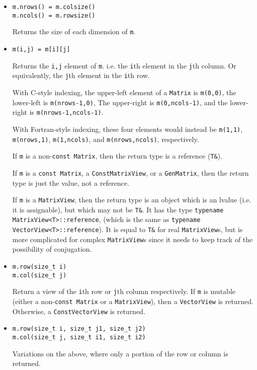 \documentclass[twoside,letterpaper,11pt]{article}
\renewcommand{\tt}[1]{{\texttt {#1}}}
\begin{document}
\begin{itemize}
\item
\begin{verbatim}
m.nrows() = m.colsize()
m.ncols() = m.rowsize()
\end{verbatim}
Returns the size of each dimension of \tt{m}. 

\item
\begin{verbatim}
m(i,j) = m[i][j]
\end{verbatim}
Returns the \tt{i,j} element of \tt{m}. i.e. the \tt{i}th element in the 
\tt{j}th column.  Or
equivalently, the \tt{j}th element in the \tt{i}th row. 

With C-style indexing, the upper-left element
of a \tt{Matrix} is \tt{m(0,0)}, the lower-left is \tt{m(nrows-1,0)},
The upper-right is \tt{m(0,ncols-1)}, and the lower-right is
\tt{m(nrows-1,ncols-1)}.

With Fortran-style indexing, these four elements would instead be
\tt{m(1,1)}, \tt{m(nrows,1)}, \tt{m(1,ncols)}, and \tt{m(nrows,ncols)},
respectively.

If \tt{m} is a 
non-\tt{const Matrix}, then the return type is a reference (\tt{T\&}).

If \tt{m} is a 
\tt{const Matrix}, a \tt{ConstMatrixView}, or a \tt{GenMatrix}, 
then the return type is just the value, not a reference.

If \tt{m} is a \tt{MatrixView}, then the return type is an object
which is an lvalue (i.e. it is assignable), but which may not be \tt{T\&}.
It has the type \tt{typename MatrixView<T>::reference}, 
(which is the same as \tt{typename VectorView<T>::reference}).
It is equal to \tt{T\&} for real \tt{MatrixView}s, but is
more complicated for complex \tt{MatrixView}s since it needs to 
keep track of the possibility of conjugation.

\item
\begin{verbatim}
m.row(size_t i)
m.col(size_t j)
\end{verbatim}
Return a view of the \tt{i}th row or \tt{j}th column respectively.
If \tt{m} is mutable (either a non-\tt{const Matrix} or a \tt{MatrixView}),
then a \tt{VectorView} is returned.  Otherwise, a \tt{ConstVectorView}
is returned.

\item
\begin{verbatim}
m.row(size_t i, size_t j1, size_t j2)
m.col(size_t j, size_t i1, size_t i2)
\end{verbatim}
Variations on the above, where only a portion of the row or column
is returned.  


\end{itemize}
\end{document}
